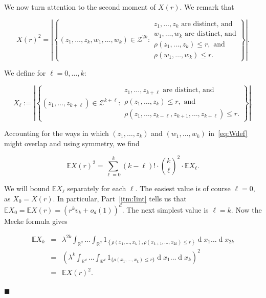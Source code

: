 \documentclass[11pt]{article}%
\newenvironment{proofof}[1]{\vspace{1ex}\noindent{\bf Proof of #1.}}{\hspace*{\fill}$\blacksquare$\vspace{1ex}}
\newcommand{\Zcal}[0]{\ensuremath{{\mathcal Z}}}
\newcommand{\eR}[0]{\ensuremath{ \mathbb R}}
\newcommand{\Ee}[0]{\ensuremath{{\mathbb E}}}
\DeclareMathOperator{\dd}{d}
\begin{document}
\begin{proofof}{Lemma~\ref{lem:Iint}}
We now turn attention to the second moment of $X(r)$.
We remark that

\begin{equation}\label{eq:Wdef} 
X(r)^2 = \left|\left\{ (z_1,\dots,z_k, w_1,\dots,w_k) \in \Zcal^{2k} : \begin{array}{l} 
z_1,\dots,z_k \text{ are distinct, and} \\
w_1,\dots,w_k \text{ are distinct, and} \\
\rho(z_1,\dots,z_k) \leq r, \text{ and} \\
\rho(w_1,\dots,w_k) \leq r.\end{array}\right\}\right|.
\end{equation}

\noindent
We define for $\ell=0,\dots,k$:

$$
X_{\ell} := \left|\left\{ (z_1,\dots,z_{k+\ell}) \in \Zcal^{k+\ell} : 
\begin{array}{l} 
z_1,\dots,z_{k+\ell} \text{ are distinct, and} \\
\rho(z_1,\dots,z_k) \leq r, \text{ and} \\ 
\rho(z_1,\dots,z_{k-\ell}, z_{k+1},\dots,z_{k+\ell}) \leq r.
\end{array}\right\}\right|.
$$

\noindent
Accounting for the ways in which $(z_1,\dots,z_k)$ and $(w_1,\dots,w_k)$ in~\eqref{eq:Wdef} might overlap 
and using symmetry, we find 

\begin{equation}\label{eq:EEW} 
\Ee X(r)^2 = \sum_{\ell=0}^k (k-\ell)! \cdot {k\choose\ell}^2 \cdot \Ee X_\ell. 
\end{equation}

We will bound $\Ee X_\ell$ separately for each $\ell$.
The easiest value is of course $\ell=0$, as $X_0=X(r)$. 
In particular, Part~\ref{itm:Iint} tells us that $\Ee X_0 = \Ee X(r) = \left( r^k v_k + o_d(1)\right)^d$.
The next simplest value is $\ell=k$. 
Now the Mecke formula gives

\begin{equation}\label{eq:EEWk} \begin{array}{rcl} 
\Ee X_k 
& = & \displaystyle 
\lambda^{2k} 
\int_{\eR^d}\dots\int_{\eR^d} 
1_{\left\{\rho(x_1,\dots,x_k),\rho(x_{k+1},\dots,x_{2k}) \leq r\right\}}\dd x_1\dots\dd x_{2k} \\[2ex]
 & = & \displaystyle 
 \left( \lambda^k \int_{\eR^d}\dots\int_{\eR^d} 1_{\{\rho(x_1,\dots,x_k) \leq r\}}\dd x_1\dots\dd x_k\right)^2 \\[2ex]
 & = &       
 \Ee X(r)^2. 
 \end{array} \end{equation}


\end{proofof}
\end{document}
